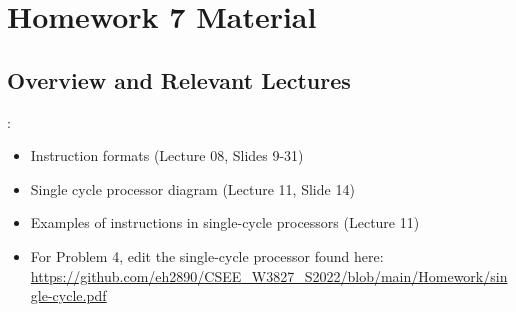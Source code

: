 \documentclass{../slides}
\begin{document}
\section{Homework 7 Material}
\subsection{Overview and Relevant Lectures}
\begin{frame}{\secname: \subsecname}
    \begin{itemize}
        \item Instruction formats (Lecture 08, Slides 9-31)
        \item Single cycle processor diagram (Lecture 11, Slide 14)
        \item Examples of instructions in single-cycle processors (Lecture 11)
        \item For Problem 4, edit the single-cycle processor found here: \url{https://github.com/eh2890/CSEE_W3827_S2022/blob/main/Homework/single-cycle.pdf}
    \end{itemize}
\end{frame}
\end{document}
